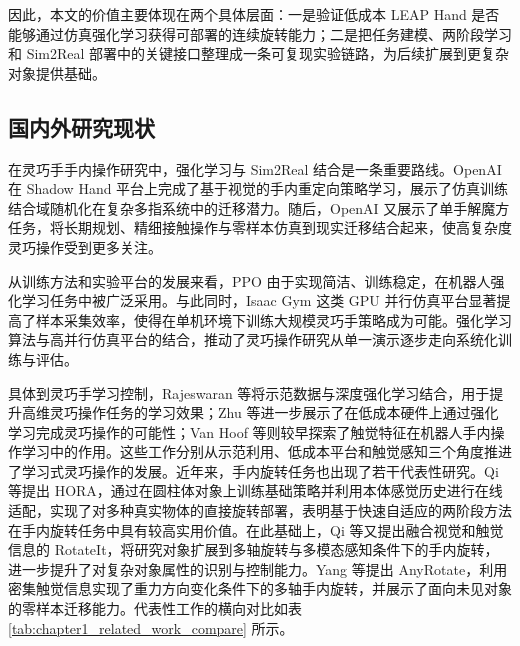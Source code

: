 因此，本文的价值主要体现在两个具体层面：一是验证低成本 LEAP Hand 是否能够通过仿真强化学习获得可部署的连续旋转能力；二是把任务建模、两阶段学习和 Sim2Real 部署中的关键接口整理成一条可复现实验链路，为后续扩展到更复杂对象提供基础。

\subsection{国内外研究现状}
\thesisbodyfont
在灵巧手手内操作研究中，强化学习与 Sim2Real 结合是一条重要路线。OpenAI 在 Shadow Hand 平台上完成了基于视觉的手内重定向策略学习，展示了仿真训练结合域随机化在复杂多指系统中的迁移潜力\cite{openai2018}。随后，OpenAI 又展示了单手解魔方任务，将长期规划、精细接触操作与零样本仿真到现实迁移结合起来，使高复杂度灵巧操作受到更多关注\cite{openai2019}。

从训练方法和实验平台的发展来看，PPO 由于实现简洁、训练稳定，在机器人强化学习任务中被广泛采用\cite{ppo2017}。与此同时，Isaac Gym 这类 GPU 并行仿真平台显著提高了样本采集效率，使得在单机环境下训练大规模灵巧手策略成为可能\cite{isaacgym2021}。强化学习算法与高并行仿真平台的结合，推动了灵巧操作研究从单一演示逐步走向系统化训练与评估。

具体到灵巧手学习控制，Rajeswaran 等将示范数据与深度强化学习结合，用于提升高维灵巧操作任务的学习效果\cite{rajeswaran2018}；Zhu 等进一步展示了在低成本硬件上通过强化学习完成灵巧操作的可能性\cite{zhu2019}；Van Hoof 等则较早探索了触觉特征在机器人手内操作学习中的作用\cite{vanhoof2015}。这些工作分别从示范利用、低成本平台和触觉感知三个角度推进了学习式灵巧操作的发展。近年来，手内旋转任务也出现了若干代表性研究。Qi 等提出 HORA，通过在圆柱体对象上训练基础策略并利用本体感觉历史进行在线适配，实现了对多种真实物体的直接旋转部署，表明基于快速自适应的两阶段方法在手内旋转任务中具有较高实用价值\cite{hora2022}。在此基础上，Qi 等又提出融合视觉和触觉信息的 RotateIt，将研究对象扩展到多轴旋转与多模态感知条件下的手内旋转，进一步提升了对复杂对象属性的识别与控制能力\cite{rotateit2023}。Yang 等提出 AnyRotate，利用密集触觉信息实现了重力方向变化条件下的多轴手内旋转，并展示了面向未见对象的零样本迁移能力\cite{anyrotate2024}。代表性工作的横向对比如表 \ref{tab:chapter1_related_work_compare} 所示。

